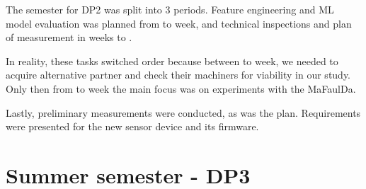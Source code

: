 The semester for DP2 was split into 3 periods. Feature engineering and ML model evaluation was planned from  to  week, and technical inspections and plan of measurement in weeks  to .

In reality, these tasks switched order because between  to  week, we needed to acquire alternative partner and check their machiners for viability in our study. Only then from  to  week the main focus was on experiments with the MaFaulDa. 

Lastly, preliminary measurements were conducted, as was the plan. Requirements were presented for the new sensor device and its firmware.
\clearpage
\newpage

\section{Summer semester - DP3}
